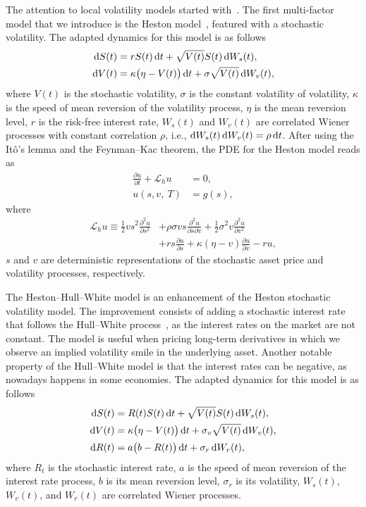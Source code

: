 \documentclass{UUThesisTemplate}
\begin{document}
\par
The attention to local volatility models started with~\cite{dupire1994pricing}. The first multi-factor model that we introduce is the Heston model~\cite{heston1993closed}, featured with a stochastic volatility. The adapted dynamics for this model is as follows
\begin{align}
\dif S(t) & =  rS(t)\dif t + \sqrt{V(t)} S(t) \dif W_s(t), \label{qlsvSDE1} \\
\dif V(t) & =  \kappa\big(\eta-V(t)\big)\dif t + \sigma \sqrt{V(t)}\dif W_v(t), \label{qlsvSDE2}
\end{align}
where $V(t)$ is the stochastic volatility, $\sigma$ is the constant volatility of volatility, $\kappa$ is the speed of mean reversion of the volatility process, $\eta$ is the mean reversion level, $r$ is the risk-free interest rate, $W_s(t)$ and $W_v(t)$ are correlated Wiener processes with constant correlation $\rho$, i.e., $\dif W_s(t) \dif W_v(t) = \rho \dif t$. After using the It\^{o}'s lemma and the Feynman--Kac theorem, the PDE for the Heston model reads as
\begin{align}
\frac{\partial u}{\partial t}+\mathcal{L}_h u&=0, \nonumber \\
u(s,v,\ T) &= g(s), \label{hstPDE}
\end{align}
where
\begin{align}
\mathcal{L}_{h} u \equiv \frac{1}{2}vs^2\frac{\partial^2 u}{\partial s^2} &+ \rho\sigma v s \frac{\partial^2 u}{\partial s\partial v} + \frac{1}{2}\sigma^2v\frac{\partial^2 u}{\partial v^2} \nonumber \\ 
               &+ rs\frac{\partial u}{\partial s} + \kappa(\eta-v)\frac{\partial u}{\partial v} - ru, \label{eqHSTop}
\end{align}
$s$ and $v$ are deterministic representations of the stochastic asset price and volatility processes, respectively.

\par
The Heston--Hull--White model is an enhancement of the Heston stochastic volatility model. The improvement consists of adding a stochastic interest rate that follows the Hull--White process~\cite{hull1990pricing}, as the interest rates on the market are not constant. The model is useful when pricing long-term derivatives in which we observe an implied volatility smile in the underlying asset. Another notable property of the Hull--White model is that the interest rates can be negative, as nowadays happens in some economies. The adapted dynamics for this model is as follows
\begin{align}
\dif S(t) & =  R(t)S(t)\dif t + \sqrt{V(t)}S(t)\dif W_s(t), \label{hhwSDE1} \\
\dif V(t) & =  \kappa\big(\eta-V(t)\big)\dif t + \sigma_v \sqrt{V(t)}\dif W_v(t), \label{hhwSDE2} \\
\dif R(t) & = a\big(b-R(t)\big)\dif t + \sigma_r\dif W_r(t), {\color{white} \sqrt{V(t)}} \label{hhwSDE3}
\end{align}
where $R_t$ is the stochastic interest rate, $a$ is the speed of mean reversion of the interest rate process, $b$ is its mean reversion level, $\sigma_r$ is its volatility,  $W_s(t)$, $W_v(t)$,  and $W_r(t)$ are correlated Wiener processes.
\end{document}
